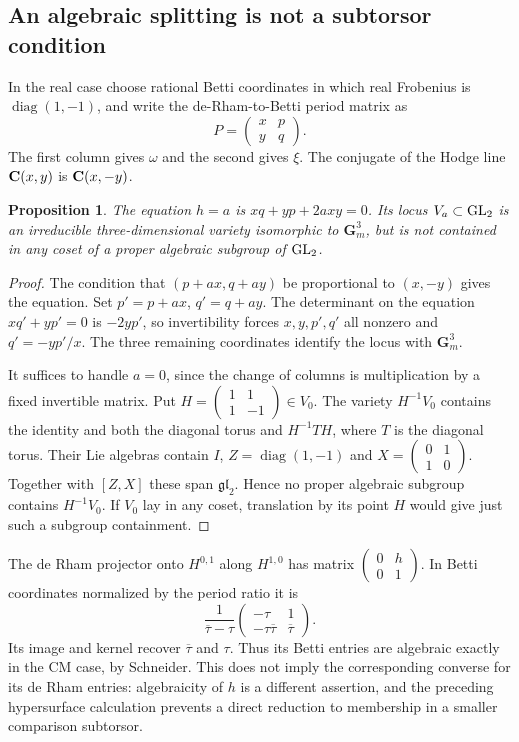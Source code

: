 \documentclass[11pt]{article}
\newtheorem{proposition}[theorem]{Proposition}
\theoremstyle{definition}\newtheorem{definition}[theorem]{Definition}
\theoremstyle{remark}\newtheorem{remark}[theorem]{Remark}
\newcommand{\Gm}{\mathbf G_m}\newcommand{\B}{\mathrm B}\newcommand{\dR}{\mathrm{dR}}
\begin{document}
\subsection{An algebraic splitting is not a subtorsor condition}
In the real case choose rational Betti coordinates in which real Frobenius is $\operatorname{diag}(1,-1)$, and write the de-Rham-to-Betti period matrix as
\[
                  P=\begin{pmatrix}x&p\\y&q\end{pmatrix}.
\]
The first column gives $\omega$ and the second gives $\xi$. The conjugate of the Hodge line $\mathbf C(x,y)$ is $\mathbf C(x,-y)$.
\begin{proposition}\label{prop:splitting-hypersurface}
The equation $h=a$ is $xq+yp+2axy=0$. Its locus $V_a\subset\operatorname{GL}_2$ is an irreducible three-dimensional variety isomorphic to $\Gm^3$, but is not contained in any coset of a proper algebraic subgroup of $\operatorname{GL}_2$.
\end{proposition}
\begin{proof}
The condition that $(p+ax,q+ay)$ be proportional to $(x,-y)$ gives the equation. Set $p'=p+ax$, $q'=q+ay$. The determinant on the equation $xq'+yp'=0$ is $-2yp'$, so invertibility forces $x,y,p',q'$ all nonzero and $q'=-yp'/x$. The three remaining coordinates identify the locus with $\Gm^3$.

It suffices to handle $a=0$, since the change of columns is multiplication by a fixed invertible matrix. Put $H=\left(\begin{smallmatrix}1&1\\1&-1\end{smallmatrix}\right)\in V_0$. The variety $H^{-1}V_0$ contains the identity and both the diagonal torus and $H^{-1}TH$, where $T$ is the diagonal torus. Their Lie algebras contain $I$, $Z=\operatorname{diag}(1,-1)$ and $X=\left(\begin{smallmatrix}0&1\\1&0\end{smallmatrix}\right)$. Together with $[Z,X]$ these span $\mathfrak{gl}_2$. Hence no proper algebraic subgroup contains $H^{-1}V_0$. If $V_0$ lay in any coset, translation by its point $H$ would give just such a subgroup containment.
\end{proof}

The de Rham projector onto $H^{0,1}$ along $H^{1,0}$ has matrix $\left(\begin{smallmatrix}0&h\\0&1\end{smallmatrix}\right)$. In Betti coordinates normalized by the period ratio it is
\[
 \frac1{\overline\tau-\tau}
 \begin{pmatrix}-\tau&1\\-\tau\overline\tau&\overline\tau\end{pmatrix}.
\]
Its image and kernel recover $\overline\tau$ and $\tau$. Thus its Betti entries are algebraic exactly in the CM case, by Schneider. This does not imply the corresponding converse for its de Rham entries: algebraicity of $h$ is a different assertion, and the preceding hypersurface calculation prevents a direct reduction to membership in a smaller comparison subtorsor.
\end{document}
